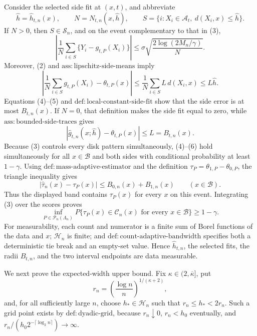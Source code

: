Consider the selected side fit at \((x,t)\), and abbreviate
\[
 \widehat h=\widehat h_{t,n}(x),\qquad
 N=N_{t,n}(x,\widehat h),\qquad
 S=\{i:X_i\in\mathcal A_t,\ d(X_i,x)\le\widehat h\}.
\]
If \(N>0\), then \(S\in\mathcal S_n\), and on the event complementary to that in (3),
\[
 \left|\frac1N\sum_{i\in S}\{Y_i-g_{t,P}(X_i)\}\right|
 \le \sigma\sqrt{\frac{2\log(2M_n/\gamma)}{N}}. \tag{4}
\]
Moreover, (2) and \(\mathrm{ass:lipschitz\text{-}side\text{-}means}\) imply
\[
 \left|\frac1N\sum_{i\in S}g_{t,P}(X_i)-\theta_{t,P}(x)\right|
 \le \frac1N\sum_{i\in S}L\,d(X_i,x)\le L\widehat h. \tag{5}
\]
Equations (4)--(5) and \(\mathrm{def:local\text{-}constant\text{-}side\text{-}fit}\) show that the side error is at most \(B_{t,n}(x)\).  If \(N=0\), that definition makes the side fit equal to zero, while \(\mathrm{ass:bounded\text{-}side\text{-}traces}\) gives
\[
 |\widehat g_{t,n}(x;\widehat h)-\theta_{t,P}(x)|\le L=B_{t,n}(x). \tag{6}
\]
Because (3) controls every disk pattern simultaneously, (4)--(6) hold simultaneously for all \(x\in\mathcal B\) and both sides with conditional probability at least \(1-\gamma\).  Using \(\mathrm{def:mass\text{-}adaptive\text{-}estimator}\) and the definition \(\tau_P=\theta_{1,P}-\theta_{0,P}\), the triangle inequality gives
\[
 |\widehat\tau_n(x)-\tau_P(x)|\le B_{0,n}(x)+B_{1,n}(x)\qquad(x\in\mathcal B). \tag{7}
\]
Thus the displayed band contains \(\tau_P(x)\) for every \(x\) on this event.  Integrating (3) over the scores proves
\[
 \inf_{P\in\mathcal P_n(\Lambda_n)}
 P\{\tau_P(x)\in\mathcal C_n(x)\text{ for every }x\in\mathcal B\}\ge1-\gamma. \tag{8}
\]
For measurability, each count and numerator is a finite sum of Borel functions of the data and \(x\); \(\mathcal H_n\) is finite; and \(\mathrm{def:count\text{-}adaptive\text{-}bandwidth}\) specifies both a deterministic tie break and an empty-set value.  Hence \(\widehat h_{t,n}\), the selected fits, the radii \(B_{t,n}\), and the two interval endpoints are data measurable.

We next prove the expected-width upper bound.  Fix \(\kappa\in(2,\overline\kappa]\), put
\[
 r_n=\left(\frac{\log n}{n}\right)^{1/(\kappa+2)}, \tag{9}
\]
and, for all sufficiently large \(n\), choose \(h_*\in\mathcal H_n\) such that \(r_n\le h_*<2r_n\).  Such a grid point exists by \(\mathrm{def:dyadic\text{-}grid}\), because \(r_n\downarrow0\), \(r_n<h_0\) eventually, and \(r_n/(h_0 2^{-\lceil\log_2 n\rceil})\to\infty\).

